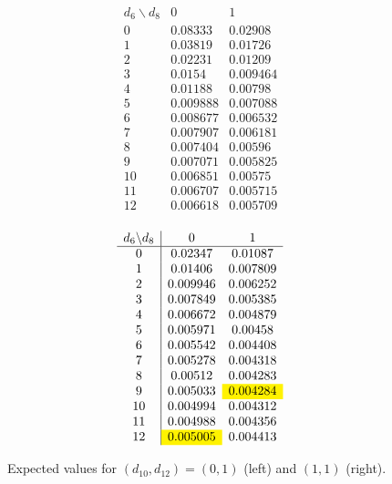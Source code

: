 \documentclass[11pt, oneside]{article} 	%
\begin{document}
\begin{figure}[ht]
    \centering
    \begin{minipage}{0.45\textwidth}
    \centering
    \[
    \begin{array}{c|cc}
    d_6 \backslash d_8 & 0 & 1\\\hline
    0&0.08333&0.02908\\
    1&0.03819&0.01726\\
    2&0.02231&0.01209\\
    3&0.0154&0.009464\\
    4&0.01188&0.00798\\
    5&0.009888&0.007088\\
    6&0.008677&0.006532\\
    7&0.007907&0.006181\\
    8&0.007404&0.00596\\
    9&0.007071&0.005825\\
    10&0.006851&0.00575\\
    11&0.006707&0.005715\\
    12&0.006618&0.005709\\
    \end{array}
    \]
    \end{minipage}
    \hfill
    \begin{minipage}{0.45\textwidth}
    \centering
    \[
    \begin{array}{c|cc}
    d_6 \backslash d_8 & 0 & 1\\\hline
    0&0.02347&0.01087\\
    1&0.01406&0.007809\\
    2&0.009946&0.006252\\
    3&0.007849&0.005385\\
    4&0.006672&0.004879\\
    5&0.005971&0.00458\\
    6&0.005542&0.004408\\
    7&0.005278&0.004318\\
    8&0.00512&0.004283\\
    9&0.005033&\cellcolor{yellow}0.004284\\
    10&0.004994&0.004312\\
    11&0.004988&0.004356\\
    12&\cellcolor{yellow}0.005005&0.004413\\
    \end{array}
    \]
    \end{minipage}
    \caption{Expected values for $(d_{10},d_{12})=(0,1)$ (left) and $(1,1)$ (right).}
    \label{fig:ev-tables-2}
\end{figure}
\end{document}
